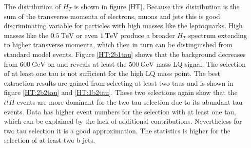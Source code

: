 %
The distribution of $H_T$ is shown in figure \ref{HT}. Because this distribution is the sum of the transverse momenta of electrons, muons and jets this is good discriminating variable for particles with high masses like the leptoquarks. High masses like the $\SI{0.5}{\tera\electronvolt}$ or even $\SI{1}{\tera\electronvolt}$ produce a broader $H_T$ spectrum extending to higher transverse momenta, which then in turn can be distinguished from standard model events. Figure \ref{HT:2b1tau} shows that the background decreases from $\SI{600}{\giga\electronvolt}$ on and reveals at least the $\SI{500}{\giga\electronvolt}$ mass LQ signal. The selection of at least one tau is not sufficient for the high LQ mass point. The best extraction results are gained from selecting at least two taus and is shown in figure \ref{HT:2b2tau} and \ref{HT:1b2tau}. These two selections again show that the $t\bar{t}H$ events are more dominant for the two tau selection due to its abundant tau events. Data has higher event numbers for the selection with at least one tau, which can be explained by the lack of additional contributions. Nevertheless for two tau selection it is a good approximation. The statistics is higher for the selection of at least two b-jets.\par    
%
